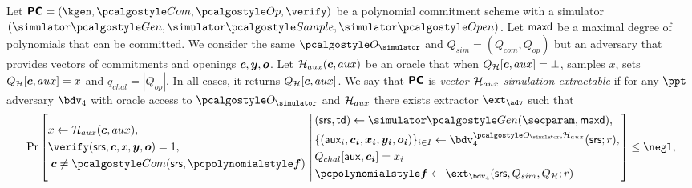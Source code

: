 \documentclass[runningheads,11pt]{llncs}
\let\spvec\vec
\let\vec\accentvec
\let\spvec\vec
\let\vec\spvec
\def\vec#1{\mathchoice{\mbox{\boldmath$\displaystyle#1$}}
  {\mbox{\boldmath$\textstyle#1$}} {\mbox{\boldmath$\scriptstyle#1$}}
  {\mbox{\boldmath$\scriptscriptstyle#1$}}}
\begin{document}
\begin{definition}
  \label{def:sepcom}
  \label{def:se_bdv4}
  Let $\PCOM = (\kgen, \com, \open, \verify)$ be a polynomial commitment scheme with
  a simulator $(\simgen, \simsample, \simopen)$. Let $\mathsf{maxd}$ be a maximal degree of
  polynomials that can be committed.  We consider the same $\oracles$ and
  $Q_{sim}= (Q_{com},Q_{op})$ but an adversary that provides vectors of commitments
  and openings $\vec{c}, \vec{y}, \vec{o}$.  Let $\ro_{aux}(\vec{c},aux)$ be an
  oracle that when $Q_{\ro}[\vec{c},aux] = \bot$, samples $x$, sets
  $Q_{\ro}[\vec{c},aux]=x$ and $q_{{chal}}= |Q_{{op}}|$. In all cases, it returns
  $Q_{\ro}[\vec{c},aux]$.  We say that $\bm{\mathsf{PC}}$ is \emph{vector $\mathcal{H}_{aux}$ simulation
    extractable} if for any $\ppt$ adversary $\bdv_4$ with oracle access to
  $\oracles$ and $\mathcal{H}_{aux}$ there exists extractor $\ext_{\adv}$ such that
\[
  \Pr \left[
    \begin{aligned}
      & x \gets \ro_{aux}(\vec{c},aux), \\
      & \verify(\srs, \vec{c}, x, \vec{y}, \vec{o}) = 1, \\
      & \;\vec{c} \neq \com(\srs, \vec{\p{f}})\\
    \end{aligned}
    \,\left|\,
      \vphantom{
        \begin{aligned}
          & \\
          & \\
          & \\
          &
        \end{aligned}
        }
    \begin{aligned}
      & (\srs, \td) \gets \simgen(\secparam, \maxdeg),\\
      & \smallset{(\aux_i, \vec{c_i}, \vec{x_i}, \vec{y_i}, \vec{o_i})}_{i \in I} \gets
      \bdv_4^{\oracles,\ro_{aux}}(\srs; r), \\
      & \Qchal[\aux, \vec{c_i}] = x_i\\
      & \vec{\p{f}} \gets \ext_{\bdv_4}(\srs, Q_{sim}, Q_{\ro}; r)
    \end{aligned}
  \right.\right]
  \leq \negl,
\]
\end{definition}
\end{document}
